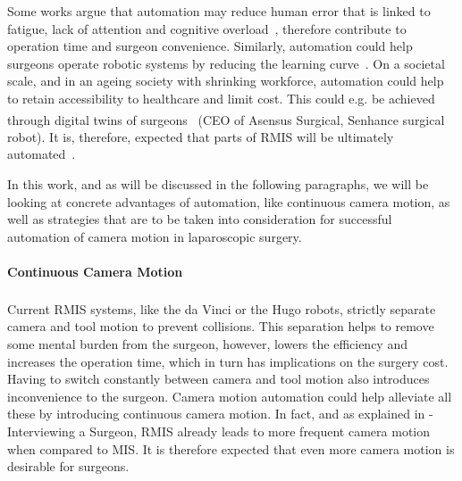 
Some works argue that automation may reduce human error that is linked to fatigue, lack of attention and cognitive overload~\cite{fiorini2022concepts}, therefore contribute to operation time and surgeon convenience. Similarly, automation could help surgeons operate robotic systems by reducing the learning curve~\cite{van2018learning}. On a societal scale, and in an ageing society with shrinking workforce, automation could help to retain accessibility to healthcare and limit cost. This could e.g. be achieved through digital twins of surgeons~\cite{zidane2023robotics} (CEO of Asensus Surgical, Senhance\textsuperscript{\texttrademark} surgical robot). It is, therefore, expected that parts of RMIS will be ultimately automated~\cite{davenport2019potential,zidane2022robotics}.

In this work, and as will be discussed in the following paragraphs, we will be looking at concrete advantages of automation, like continuous camera motion, as well as strategies that are to be taken into consideration for successful automation of camera motion in laparoscopic surgery.


\paragraph{Continuous Camera Motion} Current RMIS systems, like the da Vinci\textsuperscript{\textregistered} or the Hugo\textsuperscript{\texttrademark} robots, strictly separate camera and tool motion to prevent collisions. This separation helps to remove some mental burden from the surgeon, however, lowers the efficiency and increases the operation time, which in turn has implications on the surgery cost. Having to switch constantly between camera and tool motion also introduces inconvenience to the surgeon. Camera motion automation could help alleviate all these by introducing continuous camera motion. In fact, and as explained in  - Interviewing a Surgeon, RMIS already leads to more frequent camera motion when compared to MIS. It is therefore expected that even more camera motion is desirable for surgeons.

